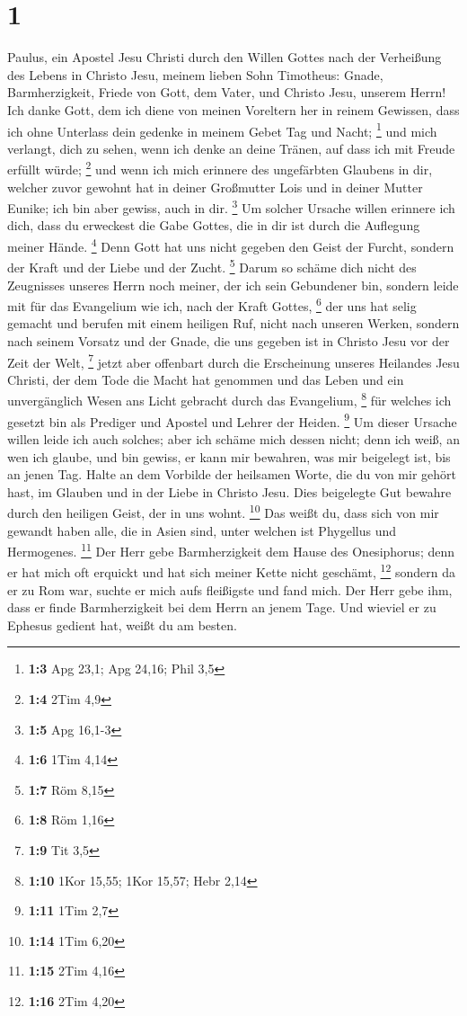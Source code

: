 \hypertarget{section}{%
\section{1}\label{section}}

 Paulus, ein Apostel Jesu Christi durch den Willen Gottes
nach der Verheißung des Lebens in Christo Jesu,  meinem
lieben Sohn Timotheus: Gnade, Barmherzigkeit, Friede von Gott, dem
Vater, und Christo Jesu, unserem Herrn!  Ich danke Gott,
dem ich diene von meinen Voreltern her in reinem Gewissen, dass ich ohne
Unterlass dein gedenke in meinem Gebet Tag und Nacht; \footnote{\textbf{1:3}
  Apg 23,1; Apg 24,16; Phil 3,5}  und mich verlangt, dich
zu sehen, wenn ich denke an deine Tränen, auf dass ich mit Freude
erfüllt würde; \footnote{\textbf{1:4} 2Tim 4,9}  und wenn
ich mich erinnere des ungefärbten Glaubens in dir, welcher zuvor gewohnt
hat in deiner Großmutter Lois und in deiner Mutter Eunike; ich bin aber
gewiss, auch in dir. \footnote{\textbf{1:5} Apg 16,1-3} 
Um solcher Ursache willen erinnere ich dich, dass du erweckest die Gabe
Gottes, die in dir ist durch die Auflegung meiner Hände. \footnote{\textbf{1:6}
  1Tim 4,14}  Denn Gott hat uns nicht gegeben den Geist
der Furcht, sondern der Kraft und der Liebe und der Zucht. \footnote{\textbf{1:7}
  Röm 8,15}  Darum so schäme dich nicht des Zeugnisses
unseres Herrn noch meiner, der ich sein Gebundener bin, sondern leide
mit für das Evangelium wie ich, nach der Kraft Gottes, \footnote{\textbf{1:8}
  Röm 1,16}  der uns hat selig gemacht und berufen mit
einem heiligen Ruf, nicht nach unseren Werken, sondern nach seinem
Vorsatz und der Gnade, die uns gegeben ist in Christo Jesu vor der Zeit
der Welt, \footnote{\textbf{1:9} Tit 3,5}  jetzt aber
offenbart durch die Erscheinung unseres Heilandes Jesu Christi, der dem
Tode die Macht hat genommen und das Leben und ein unvergänglich Wesen
ans Licht gebracht durch das Evangelium, \footnote{\textbf{1:10} 1Kor
  15,55; 1Kor 15,57; Hebr 2,14}  für welches ich gesetzt
bin als Prediger und Apostel und Lehrer der Heiden. \footnote{\textbf{1:11}
  1Tim 2,7}  Um dieser Ursache willen leide ich auch
solches; aber ich schäme mich dessen nicht; denn ich weiß, an wen ich
glaube, und bin gewiss, er kann mir bewahren, was mir beigelegt ist, bis
an jenen Tag.  Halte an dem Vorbilde der heilsamen Worte,
die du von mir gehört hast, im Glauben und in der Liebe in Christo Jesu.
 Dies beigelegte Gut bewahre durch den heiligen Geist,
der in uns wohnt. \footnote{\textbf{1:14} 1Tim 6,20}  Das
weißt du, dass sich von mir gewandt haben alle, die in Asien sind, unter
welchen ist Phygellus und Hermogenes. \footnote{\textbf{1:15} 2Tim 4,16}
 Der Herr gebe Barmherzigkeit dem Hause des Onesiphorus;
denn er hat mich oft erquickt und hat sich meiner Kette nicht geschämt,
\footnote{\textbf{1:16} 2Tim 4,20}  sondern da er zu Rom
war, suchte er mich aufs fleißigste und fand mich.  Der
Herr gebe ihm, dass er finde Barmherzigkeit bei dem Herrn an jenem Tage.
Und wieviel er zu Ephesus gedient hat, weißt du am besten.

